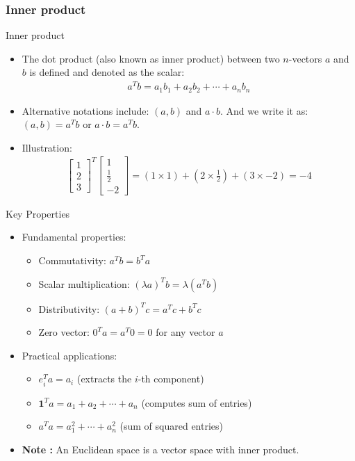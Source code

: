 \subsubsection{Inner product}
\begin{frame}{Inner product}
    \begin{itemize}
            \item The dot product (also known as inner product) between two $n$-vectors $a$ and $b$ is defined  and denoted as the scalar:
            \begin{align}
                    a^Tb = a_1b_1 + a_2b_2 +  \cdots + a_n b_n
            \end{align}
            \item Alternative notations include: $(a, b)$ and $a\cdot b$. And we write it as: $(a, b)=a^Tb$ or $a\cdot b = a^Tb$.
            \item Illustration:
            \begin{align}
                    \begin{bmatrix}
                            1\\2\\3
                    \end{bmatrix}^T \begin{bmatrix}
                            1\\\frac{1}{2}\\-2
                    \end{bmatrix} = (1\times 1)+ (2\times \frac 1 2) + (3 \times -2) = -4
            \end{align}
    \end{itemize}  
\end{frame}

\begin{frame}{Key Properties}
\begin{itemize}
        \item Fundamental properties:
        \begin{itemize}
        \item Commutativity: $a^T b = b^T a$
        \item Scalar multiplication: $(\lambda a)^T b = \lambda (a^T b)$
        \item Distributivity: $(a + b) ^Tc = a^T c + b^T c$
        \item Zero vector: $0^T a = a^T 0 = 0$ for any vector $a$
\end{itemize}
\item Practical applications:
\begin{itemize}
        \item $e^T_i a = a_i$ (extracts the $i$-th component)
        \item $\boldsymbol{1}^T a = a_1 +a_2 + \cdots + a_n$ (computes sum of entries)
        \item $a^Ta = a_1^2 + \cdots + a_n^2$ (sum of squared entries)
\end{itemize}
\item \textbf{Note :} An Euclidean space is a vector space  with inner product.
\end{itemize}    
\end{frame}


